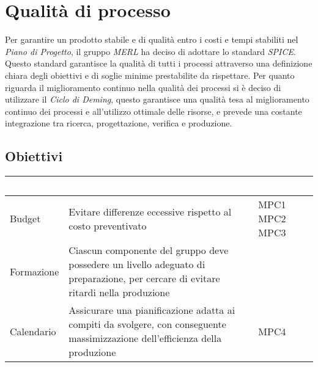 \chapter{Qualità di processo}
Per garantire un prodotto stabile e di qualità entro i costi e tempi stabiliti nel \textit{Piano di Progetto}, il gruppo \textit{MERL} ha deciso di adottare lo standard \textit{SPICE}. Questo standard garantisce la qualità di tutti i processi attraverso una definizione chiara degli obiettivi e di soglie minime prestabilite da rispettare.
Per quanto riguarda il miglioramento continuo nella qualità dei processi si è deciso di utilizzare il \textit{Ciclo di Deming}, questo garantisce una qualità tesa al miglioramento continuo dei processi e all'utilizzo ottimale delle risorse, e prevede una costante integrazione tra ricerca, progettazione, verifica e produzione.
\section{Obiettivi}
\begin{center}
  \begin{tabular}{|p{2.5cm}|p{8cm}|p{1.7cm}|} \hline
    \rowcolor[HTML]{036400}
    \textcolor{white}{\textbf{Obiettivo}} & \textcolor{white}{\textbf{Descrizione}} & \textcolor{white}{\textbf{Metrica}}  \\ \hline
    \rowcolor[HTML]{EFEFEF}
    Budget & Evitare differenze eccessive rispetto al costo preventivato & MPC1 \newline MPC2 \newline MPC3     \\ \hline
    \rowcolor[HTML]{C0C0C0}
    Formazione & Ciascun componente del gruppo deve possedere un livello adeguato di preparazione, per cercare di evitare ritardi nella produzione   & \    \\ \hline
    \rowcolor[HTML]{EFEFEF}
    Calendario & Assicurare una pianificazione adatta ai compiti da svolgere, con conseguente massimizzazione dell'efficienza della produzione  & MPC4       \\ \hline
  \end{tabular}
\end{center}
